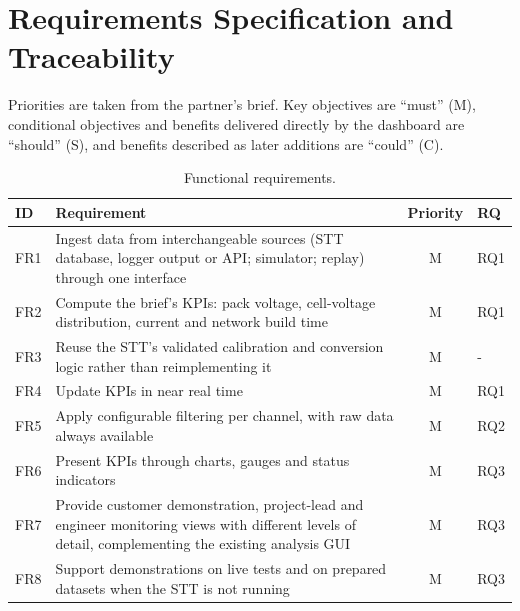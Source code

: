 \section{Requirements Specification and Traceability}
\label{sec:trace}

Priorities are taken from the partner's brief.
Key objectives are ``must'' (M), conditional objectives and benefits delivered directly by the dashboard are ``should'' (S), and benefits described as later additions are ``could'' (C).

\begin{table}[H]
    \centering\small
    \caption{Functional requirements.}
    \label{tab:fr}
    \begin{tabularx}{\columnwidth}{lYcl}
        \toprule
        ID   & Requirement                                                                                                                                         & Priority & RQ  \\
        \midrule
        FR1  & Ingest data from interchangeable sources (STT database, logger output or API; simulator; replay) through one interface & M & RQ1 \\
        FR2  & Compute the brief's KPIs: pack voltage, cell-voltage distribution, current and network build time & M & RQ1 \\
        FR3  & Reuse the STT's validated calibration and conversion logic rather than reimplementing it & M & - \\
        FR4  & Update KPIs in near real time                                                                                                                       & M        & RQ1 \\
        FR5  & Apply configurable filtering per channel, with raw data always available                                                                            & M        & RQ2 \\
        FR6  & Present KPIs through charts, gauges and status indicators                                                                                           & M        & RQ3 \\
        FR7  & Provide customer demonstration, project-lead and engineer monitoring views with different levels of detail, complementing the existing analysis GUI & M & RQ3 \\
        FR8  & Support demonstrations on live tests and on prepared datasets when the STT is not running & M & RQ3 \\

\end{tabularx}
\end{table}
